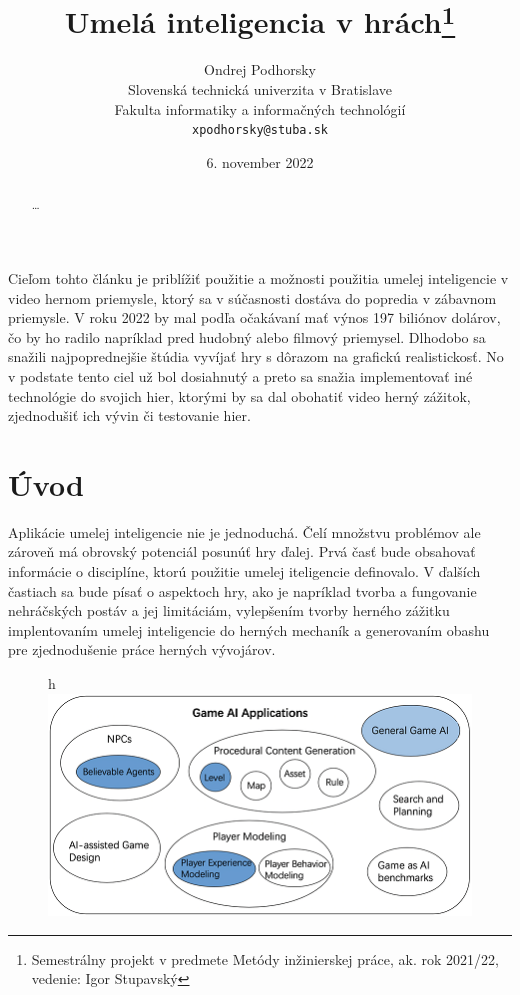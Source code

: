 \documentclass{article}
\title{Umelá inteligencia v hrách\thanks{Semestrálny projekt v predmete Metódy inžinierskej práce, ak. rok 2021/22, vedenie: Igor Stupavský}}
\author{Ondrej Podhorsky\\[2pt]
	{\small Slovenská technická univerzita v Bratislave}\\
	{\small Fakulta informatiky a informačných technológií}\\
	{\small \texttt{xpodhorsky@stuba.sk}}
	}
\date{\small 6. november 2022}
\begin{document}
\maketitle

\begin{abstract}
\ldots
\end{abstract}

Cieľom tohto článku je priblížiť použitie a možnosti použitia umelej inteligencie v video hernom priemysle, ktorý sa v súčasnosti dostáva do popredia v zábavnom priemysle. V roku 2022 by mal podľa očakávaní mať výnos 197 biliónov dolárov, čo by ho radilo napríklad pred hudobný alebo filmový priemysel. Dlhodobo sa snažili najpoprednejšie štúdia vyvíjať hry s dôrazom  na grafickú realistickosť. No v podstate tento ciel už bol dosiahnutý a preto sa snažia implementovať iné technológie do svojich hier, ktorými by sa dal obohatiť video herný zážitok, zjednodušiť ich vývin či testovanie hier.
\clearpage
\section{Úvod}

Aplikácie umelej inteligencie nie je jednoduchá. Čelí množstvu problémov ale zároveň má obrovský potenciál posunúť hry ďalej. Prvá časť bude obsahovať informácie o disciplíne, ktorú použitie umelej iteligencie definovalo. V ďalších častiach sa bude písať o aspektoch hry, ako je napríklad tvorba a fungovanie nehráčských postáv a jej limitáciám, vylepšením tvorby herného zážitku implentovaním umelej inteligencie do herných mechaník a generovaním obashu pre zjednodušenie práce herných vývojárov.

\begin{figure}{h}
\centering
\includegraphics[width=\textwidth]{Game-AI-Applications.png}
\end{figure}
\end{document}
